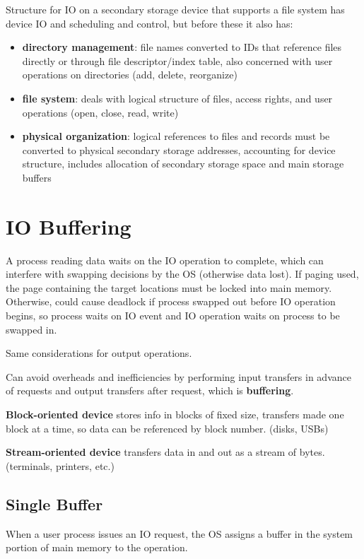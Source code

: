 \documentclass[11pt]{article}
\begin{document}
Structure for IO on a secondary storage device that supports a file system has device IO and
scheduling and control, but before these it also has:
\begin{itemize}
\item \textbf{directory management}: file names converted to IDs that reference files directly or through
file descriptor/index table, also concerned with user operations on directories
(add, delete, reorganize)
\item \textbf{file system}: deals with logical structure of files, access rights, and user operations
(open, close, read, write)
\item \textbf{physical organization}: logical references to files and records must be converted to physical
secondary storage addresses, accounting for device structure, includes allocation of secondary
storage space and main storage buffers
\end{itemize}
\section{IO Buffering}
\label{sec:org3f86f56}
A process reading data waits on the IO operation to complete, which can interfere with swapping
decisions by the OS (otherwise data lost).
If paging used, the page containing the target locations must be locked into main memory.
Otherwise, could cause deadlock if process swapped out before IO operation begins, so process waits on IO
event and IO operation waits on process to be swapped in.

Same considerations for output operations.

Can avoid overheads and inefficiencies by performing input transfers in advance of requests and
output transfers after request, which is \textbf{buffering}.

\textbf{Block-oriented device} stores info in blocks of fixed size, transfers made one block at a time, so
data can be referenced by block number. (disks, USBs)

\textbf{Stream-oriented device} transfers data in and out as a stream of bytes. (terminals, printers, etc.)
\subsection{Single Buffer}
\label{sec:org044b613}
When a user process issues an IO request, the OS assigns a buffer in the system portion of main
memory to the operation.
\end{document}
